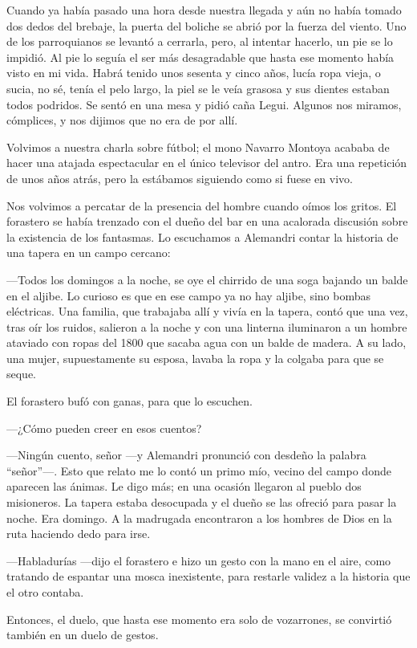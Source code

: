 \documentclass[11pt,twoside,openright]{book}
\begin{document}
Cuando ya había pasado una hora desde nuestra llegada y aún no había tomado dos dedos del brebaje, la puerta del boliche se abrió por la fuerza del viento. Uno de los parroquianos se levantó a cerrarla, pero, al intentar hacerlo, un pie se lo impidió. Al pie lo seguía el ser más desagradable que hasta ese momento había visto en mi vida. Habrá tenido unos sesenta y cinco años, lucía ropa vieja, o sucia, no sé, tenía el pelo largo, la piel se le veía grasosa y sus dientes estaban todos podridos. Se sentó en una mesa y pidió caña Legui. Algunos nos miramos, cómplices, y nos dijimos que no era de por allí.

Volvimos a nuestra charla sobre fútbol; el mono Navarro Montoya acababa de hacer una atajada espectacular en el único televisor del antro. Era una repetición de unos años atrás, pero la estábamos siguiendo como si fuese en vivo.

Nos volvimos a percatar de la presencia del hombre cuando oímos los gritos. El forastero se había trenzado con el dueño del bar en una acalorada discusión sobre la existencia de los fantasmas. Lo escuchamos a Alemandri contar la historia de una tapera en un campo cercano:

—Todos los domingos a la noche, se oye el chirrido de una soga bajando un balde en el aljibe. Lo curioso es que en ese campo ya no hay aljibe, sino bombas eléctricas. Una familia, que trabajaba allí y vivía en la tapera, contó que una vez, tras oír los ruidos, salieron a la noche y con una linterna iluminaron a un hombre ataviado con ropas del 1800 que sacaba agua con un balde de madera. A su lado, una mujer, supuestamente su esposa, lavaba la ropa y la colgaba para que se seque.

El forastero bufó con ganas, para que lo escuchen.

—¿Cómo pueden creer en esos cuentos?

—Ningún cuento, señor —y Alemandri pronunció con desdeño la palabra “señor”—. Esto que relato me lo contó un primo mío, vecino del campo donde aparecen las ánimas. Le digo más; en una ocasión llegaron al pueblo dos misioneros. La tapera estaba desocupada y el dueño se las ofreció para pasar la noche. Era domingo. A la madrugada encontraron a los hombres de Dios en la ruta haciendo dedo para irse.

—Habladurías —dijo el forastero e hizo un gesto con la mano en el aire, como tratando de espantar una mosca inexistente, para restarle validez a la historia que el otro contaba.

Entonces, el duelo, que hasta ese momento era solo de vozarrones, se convirtió también en un duelo de gestos.
\end{document}
